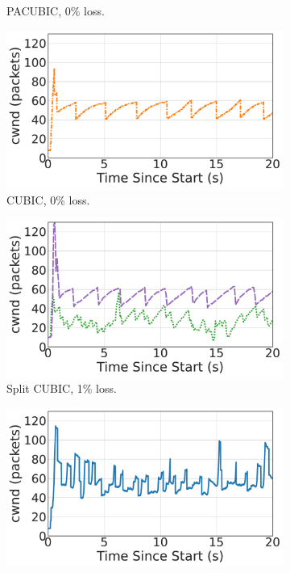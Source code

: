 \begin{figure}[h]
\begin{subfigure}{0.32\linewidth}
	\caption{PACUBIC, 0\% loss.}
	\label{fig:time-cwnd:pacubic-loss0p}
\end{subfigure}
\begin{subfigure}{0.32\linewidth}
	\includegraphics[width=\linewidth]{sidekick-paper/figures/cwnd/cwnd_cubic_loss0p.pdf}
	\caption{CUBIC, 0\% loss.}
	\label{fig:time-cwnd:cubic-loss0p}
\end{subfigure}
\begin{subfigure}{0.32\linewidth}
	\includegraphics[width=\linewidth]{sidekick-paper/figures/cwnd/cwnd_split_loss1p.pdf}
	\caption{Split CUBIC, 1\% loss.}
	\label{fig:time-cwnd:split-loss1p}
\end{subfigure}
\begin{subfigure}{0.32\linewidth}
	\includegraphics[width=\linewidth]{sidekick-paper/figures/cwnd/cwnd_pacubic_loss1p.pdf}

\end{subfigure}
\end{figure}
